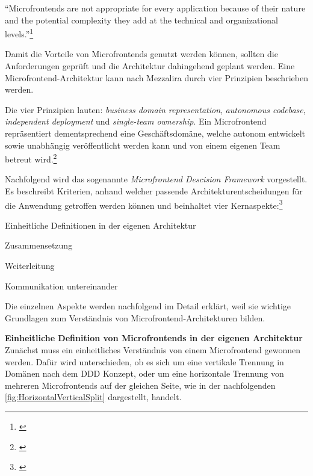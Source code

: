 \enquote{Microfrontends are not appropriate for every application because of their nature and the potential complexity they add at the technical and organizational levels.}\footnote{\cite[][20]{Mezzalira2021}}

Damit die Vorteile von Microfrontends genutzt werden können, sollten die Anforderungen geprüft und die Architektur dahingehend geplant werden. Eine Microfrontend-Architektur kann nach Mezzalira durch vier Prinzipien beschrieben werden. 

Die vier Prinzipien lauten: \textit{business domain representation}, \textit{autonomous codebase}, \textit{independent deployment} und \textit{single-team ownership}. Ein Microfrontend repräsentiert dementsprechend eine Geschäftsdomäne, welche autonom entwickelt sowie unabhängig veröffentlicht werden kann und von einem eigenen Team betreut wird.\footnote{\cite[vgl.][23]{Mezzalira2021}}

Nachfolgend wird das sogenannte \textit{Microfrontend Descision Framework} vorgestellt. Es beschreibt Kriterien, anhand welcher passende Architekturentscheidungen für die Anwendung getroffen werden können und beinhaltet vier Kernaspekte:\footnote{\cite[vgl.][24]{Mezzalira2021}}

\begin{compactitem}
	\item Einheitliche Definitionen in der eigenen Architektur
	\item Zusammensetzung
	\item Weiterleitung
	\item Kommunikation untereinander
\end{compactitem}

Die einzelnen Aspekte werden nachfolgend im Detail erklärt, weil sie wichtige Grundlagen zum Verständnis von Microfrontend-Architekturen bilden.

\textbf{Einheitliche Definition von Microfrontends in der eigenen Architektur}\\
Zunächst muss ein einheitliches Verständnis von einem Microfrontend gewonnen werden. Dafür wird unterschieden, ob es sich um eine vertikale Trennung in Domänen nach dem \gls{DDD} Konzept, oder um eine horizontale Trennung von mehreren Microfrontends auf der gleichen Seite, wie in der nachfolgenden \cref{fig:HorizontalVerticalSplit} dargestellt, handelt.


